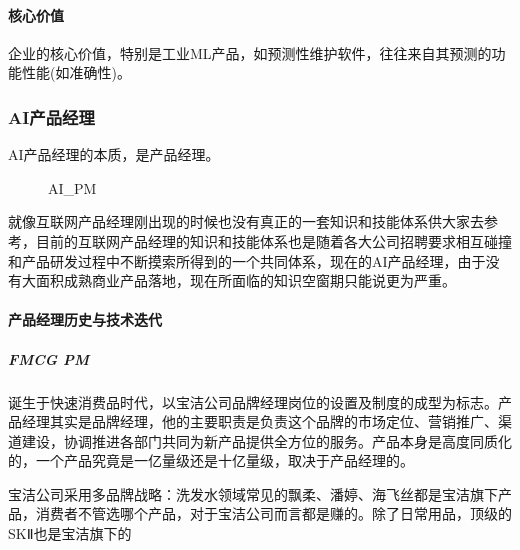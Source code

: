 \documentclass[letterpaper,11pt,english]{sphinxmanual}
\let\sphinxpxdimen\pdfpxdimen\else\newdimen\sphinxpxdimen
\begin{document}
\paragraph{核心价值}
\label{\detokenize{chapter_introduction/AI_Product:id16}}
企业的核心价值，特别是工业ML产品，如预测性维护软件，往往来自其预测的功能性能(如准确性)。%
\begin{footnote}[215]\sphinxAtStartFootnote
{}
%
\end{footnote}


\subsubsection{AI产品经理}
\label{\detokenize{chapter_introduction/AI_PM:ai}}\label{\detokenize{chapter_introduction/AI_PM::doc}}
AI产品经理的本质，是产品经理。

\begin{figure}[H]
\centering
\capstart

\noindent\sphinxincludegraphics[width=400\sphinxpxdimen]{{AI_PM}.png}
\caption{AI\_PM}\label{\detokenize{chapter_introduction/AI_PM:id46}}\end{figure}

就像互联网产品经理刚出现的时候也没有真正的一套知识和技能体系供大家去参考，目前的互联网产品经理的知识和技能体系也是随着各大公司招聘要求相互碰撞和产品研发过程中不断摸索所得到的一个共同体系，现在的AI产品经理，由于没有大面积成熟商业产品落地，现在所面临的知识空窗期只能说更为严重。


\paragraph{产品经理历史与技术迭代}
\label{\detokenize{chapter_introduction/AI_PM:id1}}

\subparagraph{FMCG PM}
\label{\detokenize{chapter_introduction/AI_PM:fmcg-pm}}
诞生于快速消费品时代，以宝洁公司品牌经理岗位的设置及制度的成型为标志。产品经理其实是品牌经理，他的主要职责是负责这个品牌的市场定位、营销推广、渠道建设，协调推进各部门共同为新产品提供全方位的服务。产品本身是高度同质化的，一个产品究竟是一亿量级还是十亿量级，取决于产品经理的。

宝洁公司采用多品牌战略：洗发水领域常见的飘柔、潘婷、海飞丝都是宝洁旗下产品，消费者不管选哪个产品，对于宝洁公司而言都是赚的。除了日常用品，顶级的SK\sphinxhyphen{}Ⅱ也是宝洁旗下的%
\begin{footnote}[216]\sphinxAtStartFootnote
{}
%
\end{footnote}
\end{document}
